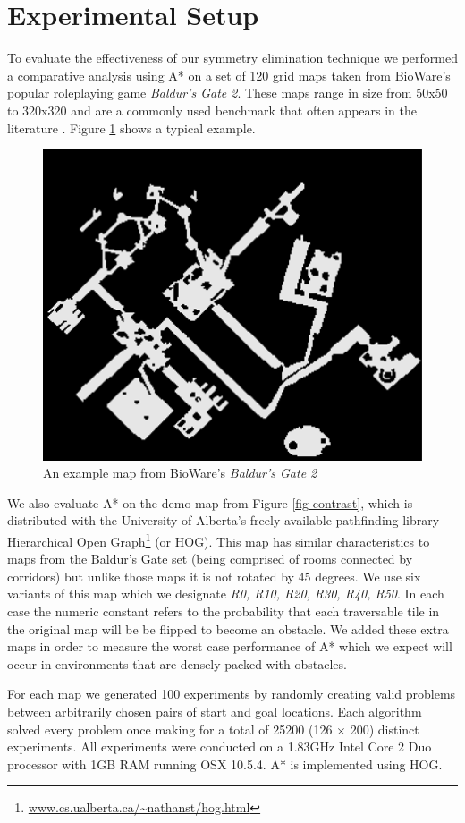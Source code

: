 \section{Experimental Setup}
To evaluate the effectiveness of our symmetry elimination technique we performed
a comparative analysis using A* on a set of 120 grid maps taken from BioWare's 
popular roleplaying game \emph{Baldur's Gate 2}. 
These maps range in size from 50x50 to 320x320 and are a commonly used benchmark 
that often appears in the literature 
\cite{botea04,bjornsson05,bjornsson06,sturtevant05,harabor08}.
Figure \ref{fig-bgmap} shows a typical example.
 \begin{figure}[b]
        \begin{center}
                        \includegraphics[width=0.8\columnwidth, trim = 10mm 10mm 10mm 0mm]{diagrams/bgmap.png}
        \end{center}
        \caption{An example map from BioWare's \emph{Baldur's Gate 2}}
        \label{fig-bgmap}
 \end{figure}
\par
We also evaluate A* on the demo map from Figure \ref{fig-contrast},
 which is distributed with the University of Alberta's freely available pathfinding library 
Hierarchical Open Graph\footnote{\url{www.cs.ualberta.ca/~nathanst/hog.html}} (or HOG).
This map has similar characteristics to maps from the Baldur's Gate set (being comprised of rooms
connected by corridors) but unlike those maps it is not rotated by 45 degrees. 
We use six variants of this map which we designate \emph{R0, R10, R20, R30, R40, R50}.
In each case the numeric constant refers to the probability that each traversable tile 
in the original map will be be flipped to become an obstacle.
We added these extra maps in order to measure the worst case performance of A* which we expect will occur in 
environments that are densely packed with obstacles.
\par
For each map we generated 100 experiments by randomly creating valid problems between arbitrarily chosen 
pairs of start and goal locations.
Each algorithm solved every problem once making for a total of 25200 (126 $\times$ 200) distinct experiments.
All experiments were conducted on a 1.83GHz Intel Core 2 Duo processor with 1GB RAM running OSX 10.5.4.
A* is implemented using HOG.
